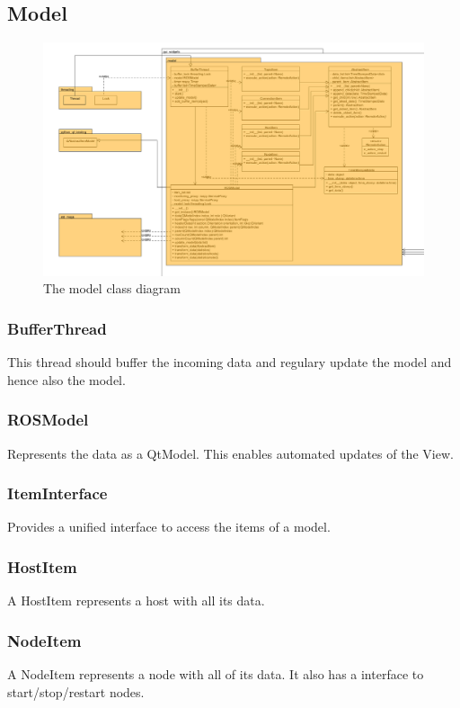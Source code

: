 \mbox{}

\subsection{Model}

\begin{figure}[!ht]
\begin{center}
\includegraphics[width=1.0\linewidth]{./bilder/model.png}
\caption{The model class diagram}
\end{center}
\end{figure}

\subsubsection{BufferThread}
This thread should buffer the incoming data and regulary update the model and
hence also the model.
\subsubsection{ROSModel}
Represents the data as a QtModel. This enables automated updates of the View.
\subsubsection{ItemInterface}
Provides a unified interface to access the items of a model.
\subsubsection{HostItem}
A HostItem represents a host with all its data.
\subsubsection{NodeItem}
 A NodeItem represents a node with all of its data. It also has a interface to start/stop/restart nodes.

